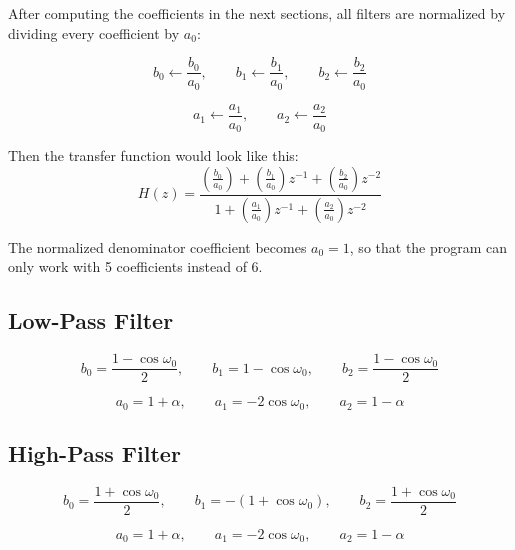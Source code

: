 After computing the coefficients in the next sections, all filters are normalized by 
dividing every coefficient by $a_0$:

$$
    b_0 \leftarrow \frac{b_0}{a_0},\qquad
    b_1 \leftarrow \frac{b_1}{a_0},\qquad
    b_2 \leftarrow \frac{b_2}{a_0}
$$

$$
    a_1 \leftarrow \frac{a_1}{a_0}, \qquad
    a_2 \leftarrow \frac{a_2}{a_0}
$$

Then the transfer function would look like this:
\begin{equation}\label{eq:norm_biquad_transfer}
    H(z) = \frac{\left(\frac{b_0}{a_0}\right) 
    + \left(\frac{b_1}{a_0}\right) z^{-1} 
    + \left(\frac{b_2}{a_0}\right) z^{-2}}
    {1 + \left(\frac{a_1}{a_0}\right) z^{-1} 
    + \left(\frac{a_2}{a_0}\right) z^{-2}}
\end{equation}

The normalized denominator coefficient becomes $a_0 = 1$, so that the program
can only work with 5 coefficients instead of 6.

\subsection{Low-Pass Filter}

$$
b_0=\frac{1-\cos\omega_0}{2},\qquad
b_1=1-\cos\omega_0, \qquad
b_2=\frac{1-\cos\omega_0}{2}
$$

$$
a_0=1+\alpha,\qquad
a_1=-2\cos\omega_0, \qquad
a_2=1-\alpha
$$



\subsection{High-Pass Filter}

$$
b_0=\frac{1+\cos\omega_0}{2}, \qquad
b_1=-(1+\cos\omega_0), \qquad
b_2=\frac{1+\cos\omega_0}{2}
$$

$$
a_0=1+\alpha, \qquad
a_1=-2\cos\omega_0, \qquad
a_2=1-\alpha
$$



